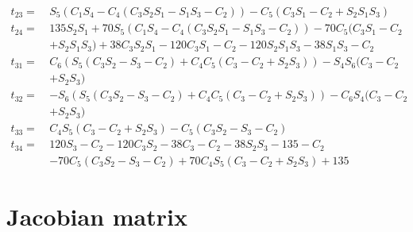 \begin{equation*}
\begin{split}
t_{23} =\ 	&S_5(C_1S_4 - C_4(C_3S_2S_1 - S_1S_3-C_2)) - C_5(C_3S_1-C_2 + S_2S_1S_3)\\
t_{24} =\ 	&135S_2S_1 + 70S_5(C_1S_4 - C_4(C_3S_2S_1 - S_1S_3-C_2)) - 70C_5(C_3S_1-C_2\\
		 	& + S_2S_1S_3) + 38C_3S_2S_1 - 120C_3S_1-C_2 - 120S_2S_1S_3 - 38S_1S_3-C_2\\
t_{31} =\ 	&C_6(S_5(C_3S_2 - S_3-C_2) + C_4C_5(C_3-C_2 + S_2S_3)) - S_4S_6(C_3-C_2\\
			& + S_2S_3)\\
t_{32} =\ 	&- S_6(S_5(C_3S_2 - S_3-C_2) + C_4C_5(C_3-C_2 + S_2S_3)) - C_6S_4(C_3-C_2\\
		 	& + S_2S_3)\\
t_{33} =\ 	&C_4S_5(C_3-C_2 + S_2S_3) - C_5(C_3S_2 - S_3-C_2)\\
t_{34} =\ 	&120S_3-C_2 - 120C_3S_2 - 38C_3-C_2 - 38S_2S_3 - 135-C_2\\
			& - 70C_5(C_3S_2 - S_3-C_2) + 70C_4S_5(C_3-C_2 + S_2S_3) + 135
\end{split}
\end{equation*}
\section{Jacobian matrix}\label{appendix:jacobian}
